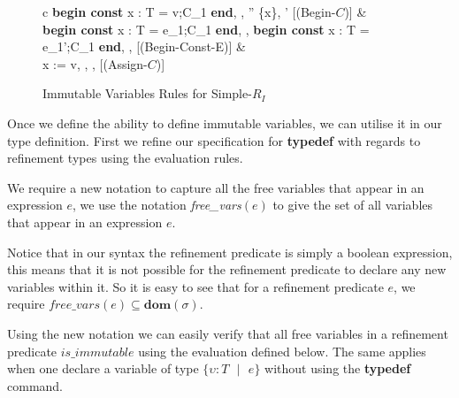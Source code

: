 \documentclass[a4paper,12pt]{report}
\begin{document}
\begin{figure}[h]
  \begin{center}
    \begin{tabular}{c}
      {\langle \textbf{begin const }x : T = v;C_1\textbf{ end}, \sigma, \tau \rangle 
      \longrightarrow \langle \sigma'' \setminus \{x\}, \tau' \rangle} [(Begin-$C$)] 
      & \\
      \footnotesize
      {\langle \textbf{begin const }x : T = e_1;C_1\textbf{ end}, \sigma,\tau \rangle 
      \longrightarrow \langle \textbf{begin const }x : T = e_1';C_1\textbf{ end}, \sigma, \tau \rangle}
      [(Begin-Const-E)]
      \normalsize
      & \\
      {\langle x := v, \sigma, \tau \rangle \longrightarrow \langle \sigma[x \mapsto v], 
      \tau \rangle} [(Assign-$C$)]
    \end{tabular}
  \end{center}
  \caption{Immutable Variables Rules for Simple-$R_{I}$}
  \label{fig:immu_rules}
\end{figure}

\par
Once we define the ability to define immutable variables, we can utilise it in 
our type definition. First we refine our specification for \textbf{typedef} 
with regards to refinement types using the evaluation rules.

\par
We require a new notation to capture all the free variables that appear in an 
expression $e$, we use the notation \textit{free\_vars}$(e)$ to give the set of all 
variables that appear in an expression $e$.

\par
Notice that in our syntax the refinement predicate is simply a boolean 
expression, this means that it is not possible for the refinement predicate to 
declare any new variables within it. So it is easy to see that for a refinement 
predicate $e$, we require $\textit{free\_vars}(e) \subseteq \textbf{dom}(\sigma)$.

\par
Using the new notation we can easily verify that all free variables in a 
refinement predicate $is\_immutable$ using the evaluation defined below. The same 
applies when one declare a variable of type $\{\upsilon : T\text{ }|\text{ }e\}$ 
without using the \textbf{typedef} command.
\end{document}
